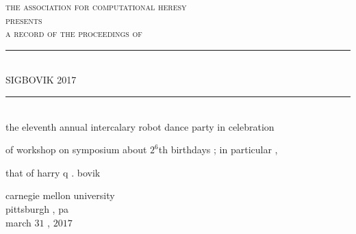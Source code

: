 \documentclass{article}
\begin{document}
\setmainfont{Splotch.ttf}
\setsansfont{Birbaslo.ttf}

\newcommand{\HRule}{\rule{\linewidth}{0.5mm}}

\begin{titlepage}
\begin{center}

\textsc{\LARGE the association for computational heresy}\\[0.5cm]

\textsc{\large presents}\\[1cm]

\textsc{\Large a record of the proceedings of}\\[0.5cm]
\HRule \\[0.4cm]
{ \Huge \sf SIGBOVIK 2017 \\[0.4cm] }

\HRule \\[2cm]


the eleventh annual intercalary robot dance party in celebration

of workshop on symposium about $2^6$th birthdays{ ;} in particular{ ,}

that of harry q{ .} bovik

\vfill

{\Large carnegie mellon university\\[0.25cm]
pittsburgh{ ,} pa\\[0.3cm]
march $31${ ,} $2017$}

\end{center}
\end{titlepage}
\end{document}
